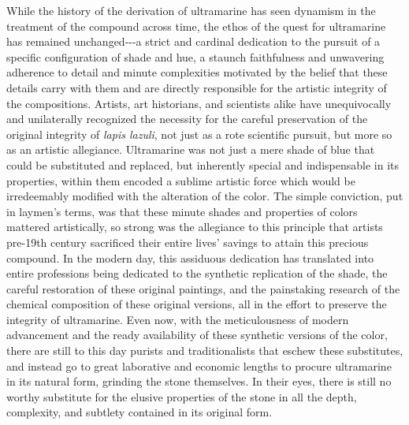 While the history of the derivation of ultramarine has seen dynamism in
the treatment of the compound across time, the ethos of the quest for
ultramarine has remained unchanged-\/-\/-a strict and cardinal
dedication to the pursuit of a specific configuration of shade and hue,
a staunch faithfulness and unwavering adherence to detail and minute
complexities motivated by the belief that these details carry with them
and are directly responsible for the artistic integrity of the
compositions. Artists, art historians, and scientists alike have
unequivocally and unilaterally recognized the necessity for the careful
preservation of the original integrity of \emph{lapis lazuli}, not just
as a rote scientific pursuit, but more so as an artistic allegiance.
Ultramarine was not just a mere shade of blue that could be substituted
and replaced, but inherently special and indispensable in its
properties, within them encoded a sublime artistic force which would be
irredeemably modified with the alteration of the color. The simple
conviction, put in laymen's terms, was that these minute shades and
properties of colors mattered artistically, so strong was the allegiance
to this principle that artists pre-19th century sacrificed their entire
lives' savings to attain this precious compound. In the modern day, this
assiduous dedication has translated into entire professions being
dedicated to the synthetic replication of the shade, the careful
restoration of these original paintings, and the painstaking research of
the chemical composition of these original versions, all in the effort
to preserve the integrity of ultramarine. Even now, with the
meticulousness of modern advancement and the ready availability of these
synthetic versions of the color, there are still to this day purists and
traditionalists that eschew these substitutes, and instead go to great
laborative and economic lengths to procure ultramarine in its natural
form, grinding the stone themselves. In their eyes, there is still no
worthy substitute for the elusive properties of the stone in all the
depth, complexity, and subtlety contained in its original form.

